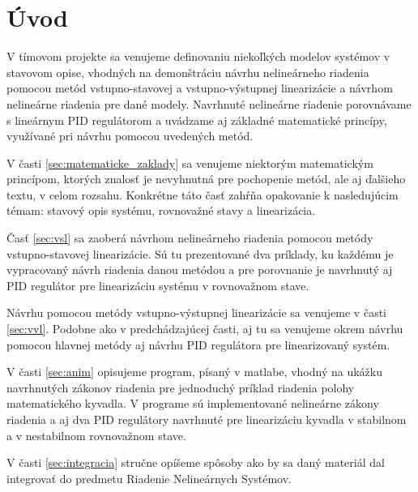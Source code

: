 \newpage
{}
{
	\section{Úvod}
}
{
}

    V tímovom projekte sa venujeme definovaniu niekoľkých modelov systémov v stavovom opise, vhodných na demonštráciu návrhu nelineárneho riadenia pomocou metód vstupno-stavovej a vstupno-výstupnej linearizácie a návrhom nelineárne riadenia pre dané modely. Navrhnuté nelineárne riadenie porovnávame s lineárnym PID regulátorom a uvádzame aj základné matematické princípy, využívané pri návrhu pomocou uvedených metód.

    V časti \ref{sec:matematicke_zaklady} sa venujeme niektorým matematickým princípom, ktorých znalosť je nevyhnutná pre pochopenie metód, ale aj ďalšieho textu, v celom rozsahu. Konkrétne táto časť zahŕňa opakovanie k nasledujúcim témam: stavový opis systému, rovnovažné stavy a linearizácia. 
    
    Časť \ref{sec:vsl} sa zaoberá návrhom nelineárneho riadenia pomocou metódy vstupno-stavovej linearizácie. Sú tu prezentované dva príklady, ku každému je vypracovaný návrh riadenia danou metódou a pre porovnanie je navrhnutý aj PID regulátor pre linearizáciu systému v rovnovažnom stave.

    Návrhu pomocou metódy vstupno-výstupnej linearizácie sa venujeme v časti \ref{sec:vvl}. Podobne ako v predchádzajúcej časti, aj tu sa venujeme okrem návrhu pomocou hlavnej metódy aj návrhu PID regulátora pre linearizovaný systém.

    V časti \ref{sec:anim} opisujeme program, písaný v matlabe, vhodný na ukážku navrhnutých zákonov riadenia pre jednoduchý príklad riadenia polohy matematického kyvadla. V programe sú implementované nelineárne zákony riadenia a aj dva PID regulátory navrhnuté pre linearizáciu kyvadla v stabilnom a v nestabilnom rovnovažnom stave.

    V časti \ref{sec:integracia} stručne opíšeme spôsoby ako by sa daný materiál dal integrovať do predmetu Riadenie Nelineárnych Systémov.

